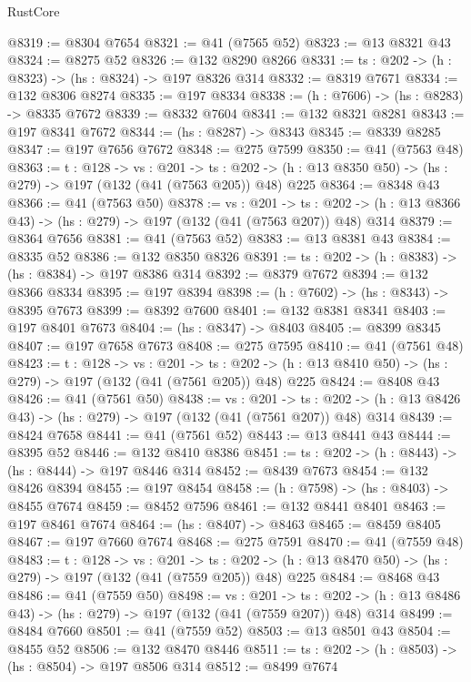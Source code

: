 \begin{lexlean}{RustCore}
\begin{coremodule}
@8319 := @8304 @7654
@8321 := @41 (@7565 @52)
@8323 := @13 @8321 @43
@8324 := @8275 @52
@8326 := @132 @8290 @8266
@8331 := {ts : @202} -> (h : @8323) -> (hs : @8324) -> @197 @8326 @314
@8332 := @8319 @7671
@8334 := @132 @8306 @8274
@8335 := @197 @8334
@8338 := (h : @7606) -> (hs : @8283) -> @8335 @7672
@8339 := @8332 @7604
@8341 := @132 @8321 @8281
@8343 := @197 @8341 @7672
@8344 := (hs : @8287) -> @8343
@8345 := @8339 @8285
@8347 := @197 @7656 @7672
@8348 := @275 @7599
@8350 := @41 (@7563 @48)
@8363 := {t : @128} ->
  {vs : @201} ->
  {ts : @202} -> (h : @13 @8350 @50) -> (hs : @279) -> @197 (@132 (@41 (@7563 @205)) @48) @225
@8364 := @8348 @43
@8366 := @41 (@7563 @50)
@8378 := {vs : @201} ->
  {ts : @202} -> (h : @13 @8366 @43) -> (hs : @279) -> @197 (@132 (@41 (@7563 @207)) @48) @314
@8379 := @8364 @7656
@8381 := @41 (@7563 @52)
@8383 := @13 @8381 @43
@8384 := @8335 @52
@8386 := @132 @8350 @8326
@8391 := {ts : @202} -> (h : @8383) -> (hs : @8384) -> @197 @8386 @314
@8392 := @8379 @7672
@8394 := @132 @8366 @8334
@8395 := @197 @8394
@8398 := (h : @7602) -> (hs : @8343) -> @8395 @7673
@8399 := @8392 @7600
@8401 := @132 @8381 @8341
@8403 := @197 @8401 @7673
@8404 := (hs : @8347) -> @8403
@8405 := @8399 @8345
@8407 := @197 @7658 @7673
@8408 := @275 @7595
@8410 := @41 (@7561 @48)
@8423 := {t : @128} ->
  {vs : @201} ->
  {ts : @202} -> (h : @13 @8410 @50) -> (hs : @279) -> @197 (@132 (@41 (@7561 @205)) @48) @225
@8424 := @8408 @43
@8426 := @41 (@7561 @50)
@8438 := {vs : @201} ->
  {ts : @202} -> (h : @13 @8426 @43) -> (hs : @279) -> @197 (@132 (@41 (@7561 @207)) @48) @314
@8439 := @8424 @7658
@8441 := @41 (@7561 @52)
@8443 := @13 @8441 @43
@8444 := @8395 @52
@8446 := @132 @8410 @8386
@8451 := {ts : @202} -> (h : @8443) -> (hs : @8444) -> @197 @8446 @314
@8452 := @8439 @7673
@8454 := @132 @8426 @8394
@8455 := @197 @8454
@8458 := (h : @7598) -> (hs : @8403) -> @8455 @7674
@8459 := @8452 @7596
@8461 := @132 @8441 @8401
@8463 := @197 @8461 @7674
@8464 := (hs : @8407) -> @8463
@8465 := @8459 @8405
@8467 := @197 @7660 @7674
@8468 := @275 @7591
@8470 := @41 (@7559 @48)
@8483 := {t : @128} ->
  {vs : @201} ->
  {ts : @202} -> (h : @13 @8470 @50) -> (hs : @279) -> @197 (@132 (@41 (@7559 @205)) @48) @225
@8484 := @8468 @43
@8486 := @41 (@7559 @50)
@8498 := {vs : @201} ->
  {ts : @202} -> (h : @13 @8486 @43) -> (hs : @279) -> @197 (@132 (@41 (@7559 @207)) @48) @314
@8499 := @8484 @7660
@8501 := @41 (@7559 @52)
@8503 := @13 @8501 @43
@8504 := @8455 @52
@8506 := @132 @8470 @8446
@8511 := {ts : @202} -> (h : @8503) -> (hs : @8504) -> @197 @8506 @314
@8512 := @8499 @7674

\end{coremodule}
\end{lexlean}
